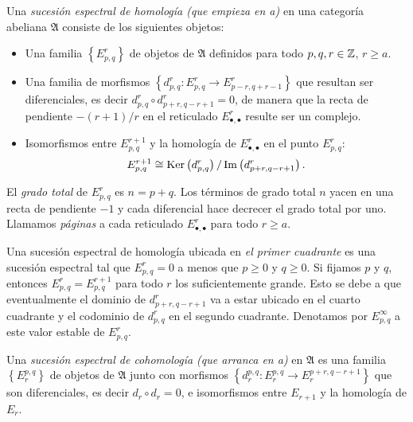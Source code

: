 \documentclass[a4paper,oneside,fleqn,11pt,../tesis.tex]{subfiles}
\begin{document}
\begin{definition}
    Una \emph{sucesión espectral de homología (que empieza en a)} en una categoría abeliana $\mathfrak{A}$ consiste de los siguientes objetos:
    \begin{itemize}
        \item Una familia $\left\lbrace E_{p, q}^{r} \right\rbrace$ de objetos de $\mathfrak{A}$ definidos para todo $p, q, r\in \mathbb{Z}$, $r\geq a$.
        \item Una familia de morfismos  $\left\lbrace d_{p, q}^{r}: E_{p, q}^{r} \to E_{p - r, q + r - 1}^{r} \right\rbrace$ que resultan
        ser diferenciales, es decir $d_{p, q}^{r} \circ d_{p + r, q - r + 1}^{r} = 0$, de manera que la recta de pendiente $-(r + 1)/r$ en el reticulado $E_{\bullet, \bullet}^{r}$ resulte ser un complejo.
        \item Isomorfismos entre $E_{p, q}^{r + 1}$ y la homología de $E^{r}_{\bullet, \bullet}$ en el punto $E_{p, q}^{r}$:
        \[
           E_{p, q}^{r + 1} \cong \operatorname{Ker}\left(d^{r}_{p, q}\right) / \operatorname{Im}\left(d^{r}_{p + r, q - r + 1}\right).
        \]
    \end{itemize}
    El \emph{grado total} de $E_{p, q}^{r}$ es $n = p + q$. Los términos de grado total $n$ yacen en una recta de pendiente $-1$ y cada
    diferencial hace decrecer el grado total por uno. Llamamos \emph{páginas} a cada reticulado $E_{\bullet, \bullet}^{r}$ para todo $r\geq a$.
\end{definition}

Una sucesión espectral de homología ubicada en \emph{el primer cuadrante}  es una sucesión espectral tal que $E_{p, q}^{r} = 0$ a menos que
$p \geq 0$ y $q \geq 0$. Si fijamos $p$ y $q$, entonces $E_{p, q}^{r} = E_{p, q}^{r + 1}$ para todo $r$ los suficientemente grande. Esto se debe
a que eventualmente el dominio de $d^{r}_{p + r, q - r + 1}$ va a estar ubicado en el cuarto cuadrante y el codominio de $d^{r}_{p, q}$ en el segundo cuadrante. Denotamos por $E_{p, q}^{\infty}$ a este valor estable de $E_{p, q}^{r}$.

\begin{definition}
    Una \emph{sucesión espectral de cohomología (que arranca en a)} en $\mathfrak{A}$ es una familia $\left\lbrace E^{p, q}_{r} \right\rbrace$
    de objetos de $\mathfrak{A}$ junto con morfismos $\left\lbrace d^{p, q}_{r}: E^{p, q}_{r} \to E^{p + r, q - r + 1}_{r} \right\rbrace$
    que son diferenciales, es decir $d_r \circ d_r = 0$, e isomorfismos entre $E_{r + 1}$ y la homología de $E_r$.
\end{definition}
\end{document}
